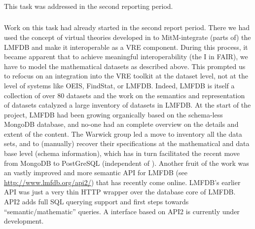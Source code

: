 \subparagraph{}
\label{dksbases@data-findstat}
This task was addressed in the second reporting period.
\medskip

\subparagraph{}
\label{dksbases@data-LMFDB}
Work on this task had already started in the second report period. There we had used the concept of virtual theories developed in  to MitM-integrate (parts of) the LMFDB and make it interoperable as a VRE component.
During this process, it became apparent that to achieve meaningful interoperability (the I in FAIR), we have to model the mathematical datasets as described above.
This prompted us to refocus on an integration into the \pn VRE toolkit at the dataset level, not at the level of systems like OEIS, FindStat, or LMFDB.
Indeed, LMFDB is itself a collection of over 80 datasets and the work on the semantics and representation of datasets catalyzed a large inventory of datasets in LMFDB.
At the start of the \pn project, LMFDB had been growing organically based on the schema-less MongoDB database, and no-one had an complete overview on the details and extent of the content.
The Warwick group led a move to inventory all the data sets, and to (manually) recover their specifications at the mathematical and data base level (schema information), which has in turn facilitated the recent move from MongoDB to PostGreSQL (independent of \pn).
Another fruit of the \pn work was an vastly improved and more semantic API for LMFDB (see \url{http://www.lmfdb.org/api2/}) that has recently come online.
LMFDB’s earlier API was just a very thin HTTP wrapper over the database core of LMFDB.
API2 adds full SQL querying support and first steps towards ``semantic/mathematic'' queries.
A \Sage interface based on API2 is currently under development.

